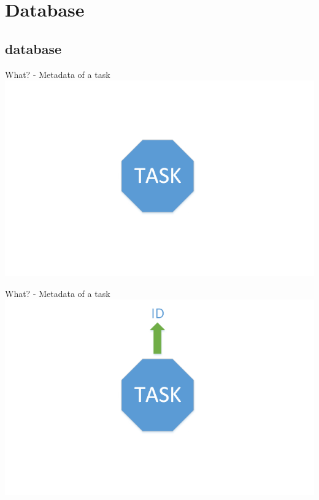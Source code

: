 \section{Database}

\subsection{database}

	\begin{frame}{What? - Metadata of a task}
	\includegraphics[width=1.0\textwidth]{images/Task/zeichnungstep5.png}
	\end{frame}
	
	\begin{frame}{What? - Metadata of a task}
	\includegraphics[width=1.0\textwidth]{images/Task/zeichnungstep4.png}
	\end{frame}
	
